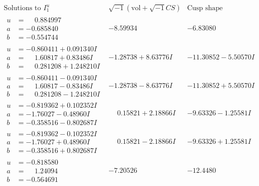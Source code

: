 \documentclass[1p]{elsarticle_modified}
\theoremstyle{definition}
\newcommand{\I}{\sqrt{-1}}
\begin{document}
$$\begin{array}{c|c|c}  
\text{Solutions to }I^u_{1}& \I (\text{vol} + \sqrt{-1}CS) & \text{Cusp shape}\\
 \hline 
\begin{aligned}
u &= \phantom{-}0.884997\phantom{ +0.000000I} \\
a &= -0.685840\phantom{ +0.000000I} \\
b &= -0.554744\phantom{ +0.000000I}\end{aligned}
 & -8.59934\phantom{ +0.000000I} & -6.83080\phantom{ +0.000000I} \\ \hline\begin{aligned}
u &= -0.860411 + 0.091340 I \\
a &= \phantom{-}1.60817 + 0.83486 I \\
b &= \phantom{-}0.281208 + 1.248210 I\end{aligned}
 & -1.28738 + 8.63776 I & -11.30852 - 5.50570 I \\ \hline\begin{aligned}
u &= -0.860411 - 0.091340 I \\
a &= \phantom{-}1.60817 - 0.83486 I \\
b &= \phantom{-}0.281208 - 1.248210 I\end{aligned}
 & -1.28738 - 8.63776 I & -11.30852 + 5.50570 I \\ \hline\begin{aligned}
u &= -0.819362 + 0.102352 I \\
a &= -1.76027 - 0.48960 I \\
b &= -0.358516 - 0.802687 I\end{aligned}
 & \phantom{-}0.15821 + 2.18866 I & -9.63326 - 1.25581 I \\ \hline\begin{aligned}
u &= -0.819362 - 0.102352 I \\
a &= -1.76027 + 0.48960 I \\
b &= -0.358516 + 0.802687 I\end{aligned}
 & \phantom{-}0.15821 - 2.18866 I & -9.63326 + 1.25581 I \\ \hline\begin{aligned}
u &= -0.818580\phantom{ +0.000000I} \\
a &= \phantom{-}1.24094\phantom{ +0.000000I} \\
b &= -0.564691\phantom{ +0.000000I}\end{aligned}
 & -7.20526\phantom{ +0.000000I} & -12.4480\phantom{ +0.000000I} \\ \hline\begin{aligned}

\end{aligned}
\end{array}$$
\end{document}
